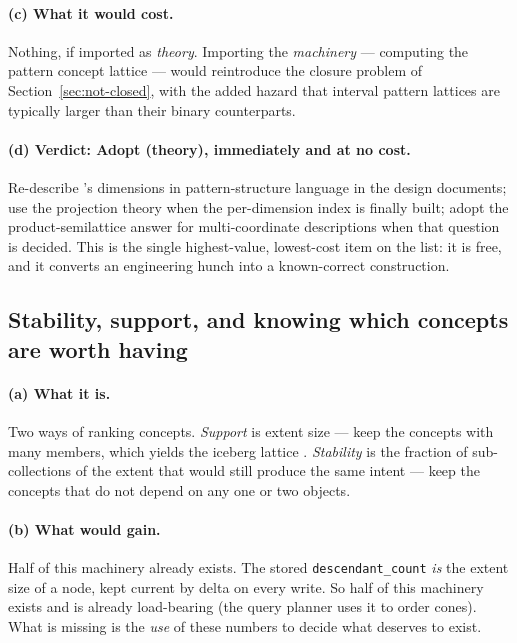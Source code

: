 \paragraph{(c) What it would cost.} Nothing, if imported as \emph{theory}.
Importing the \emph{machinery} --- computing the pattern concept lattice ---
would reintroduce the closure problem of Section~\ref{sec:not-closed}, with
the added hazard that interval pattern lattices are typically larger than
their binary counterparts.

\paragraph{(d) Verdict: \textbf{Adopt (theory)}, immediately and at no cost.}
Re-describe \odag{}'s dimensions in pattern-structure language in the design
documents; use the projection theory when the per-dimension index is finally
built; adopt the product-semilattice answer for multi-coordinate descriptions
when that question is decided. This is the single highest-value, lowest-cost
item on the list: it is free, and it converts an engineering hunch into a
known-correct construction.

\subsection{Stability, support, and knowing which concepts are worth having}
\label{sec:learn-stability}

\paragraph{(a) What it is.} Two ways of ranking concepts. \emph{Support} is
extent size --- keep the concepts with many members, which yields the iceberg
lattice \citep{stumme2002}. \emph{Stability} \citep{kuznetsov2007} is the
fraction of sub-collections of the extent that would still produce the same
intent --- keep the concepts that do not depend on any one or two objects.

\paragraph{(b) What \odag{} would gain.} Half of this machinery already
exists. The stored \verb|descendant_count| \emph{is} the extent size of a node, kept
current by delta on every write. So half of this machinery exists and is
already load-bearing (the query planner uses it to order cones). What is
missing is the \emph{use} of these numbers to decide what deserves to exist.

